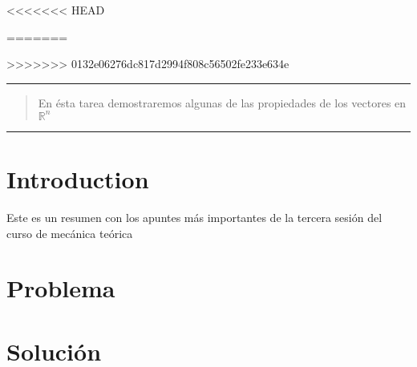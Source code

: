 \documentclass{article}
\begin{document}
<<<<<<< HEAD

=======


\maketitle      			%
>>>>>>> 0132e06276dc817d2994f808c56502fe233e634e

\tableofcontents			%

\begin{center}
	\rule[0mm]{150mm}{0.1mm}		%
	\end{center}
	
	
\begin{abstract}		%

	\noindent 				%
	En ésta tarea demostraremos algunas de las propiedades de los vectores en 
	$\mathbb{R}^{n}$
	\end{abstract}
	
\begin{center}
	\rule[0mm]{150mm}{0.1mm}
	\end{center}

\section{Introduction}		%
                            
    Este es un resumen con los apuntes más importantes de la tercera sesión del curso de mecánica teórica

\section{Problema}

\section{Solución}




	
\end{document}
